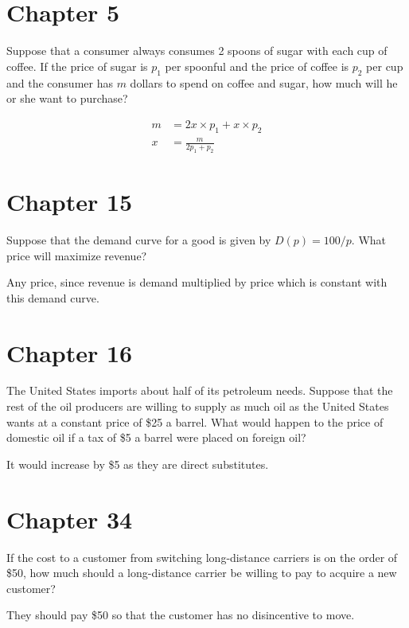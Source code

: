\documentclass{supervision}
\begin{document}
\begin{questions}
    \section*{Chapter 5}
    \question Suppose that a consumer always consumes 2 spoons of sugar with
      each cup of coffee. If the price of sugar is $p_1$ per spoonful and the
      price of coffee is $p_2$ per cup and the consumer has $m$ dollars to spend
      on coffee and sugar, how much will he or she want to purchase?

      \begin{solution}
        \begin{align*}
          m &= 2x \times p_1 + x \times p_2 \\
          x &= \frac{m}{2p_1 + p_2}
        \end{align*}
      \end{solution}

    \section*{Chapter 15}
    \question Suppose that the demand curve for a good is given by $D(p) =
      100/p$. What price will maximize revenue?

      \begin{solution}
        Any price, since revenue is demand multiplied by price which is constant
        with this demand curve.
      \end{solution}

    \section*{Chapter 16}
    \question The United States imports about half of its petroleum needs.
      Suppose that the rest of the oil producers are willing to supply as much
      oil as the United States wants at a constant price of \$25 a barrel. What
      would happen to the price of domestic oil if a tax of \$5 a barrel were
      placed on foreign oil?

      \begin{solution}
        It would increase by \$5 as they are direct substitutes.
      \end{solution}


    \section*{Chapter 34}
    \question If the cost to a customer from switching long-distance carriers is
      on the order of \$50, how much should a long-distance carrier be willing
      to pay to acquire a new customer?

      \begin{solution}
        They should pay \$50 so that the customer has no disincentive to move.
      \end{solution}


  \end{questions}
\end{document}
